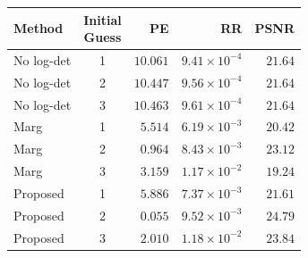 \begin{tabular}{@{}lcrrr@{}}
\toprule
Method & \shortstack{\small Initial\\Guess} & PE & RR & PSNR \\
\midrule
No log-det & 1 & $10.061$ & $9.41\times10^{-4}$ & $21.64$ \\
No log-det & 2 & $10.447$ & $9.56\times10^{-4}$ & $21.64$ \\
No log-det & 3 & $10.463$ & $9.61\times10^{-4}$ & $21.64$ \\
\addlinespace[3pt]
Marg & 1 & $5.514$ & $6.19\times10^{-3}$ & $20.42$ \\
Marg & 2 & $0.964$ & $8.43\times10^{-3}$ & $23.12$ \\
Marg & 3 & $3.159$ & $1.17\times10^{-2}$ & $19.24$ \\
\addlinespace[3pt]
Proposed & 1 & $5.886$ & $7.37\times10^{-3}$ & $21.61$ \\
Proposed & 2 & $\mathbf{0.055}$ & $9.52\times10^{-3}$ & $\mathbf{24.79}$ \\
Proposed & 3 & $2.010$ & $1.18\times10^{-2}$ & $23.84$ \\
\bottomrule
\end{tabular}
